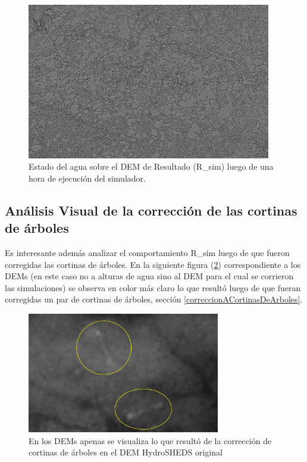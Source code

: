 \documentclass[10pt,a4paper, twoside]{report}
\begin{document}
\begin{figure}[H]
   \centering      
   \includegraphics[width=0.95\textwidth]{imagenes/ResultadoAguaSinBandeado.jpg}
 \caption{Estado del agua sobre el DEM de Resultado (R\_sim) luego de una hora de ejecución del simulador.}
 \label{ResultadoAguaSinBandeado}
\end{figure}


\subsection{Análisis Visual de la corrección de las cortinas de árboles}

Es interesante además analizar el comportamiento R\_sim luego de que fueron corregidas las cortinas de árboles. En la siguiente figura (\ref{HydoSHEDSOriginalArboles}) correspondiente a los DEMs (en este caso no a alturas de agua sino al DEM para el cual se corrieron las simulaciones) se observa en color más claro lo que resultó luego de que fueran corregidas un par de cortinas de árboles, sección \ref{correccionACortinasDeArboles}. 

\begin{figure}[H]
   \centering      
   \includegraphics[width=0.75\textwidth]{imagenes/HydoSHEDSOriginalArboles.jpg}
 \caption{En los DEMs apenas se visualiza lo que resultó de la corrección de cortinas de árboles en el DEM HydroSHEDS original}
 \label{HydoSHEDSOriginalArboles}
\end{figure}
\end{document}
